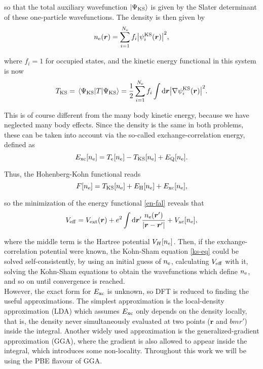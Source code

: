so that the total auxiliary wavefunction \(\ket{\Psi_{\mathrm{KS}}}\) is given by the Slater determinant of these one-particle wavefunctions. The density is then given by
\begin{equation}
	n_{\mathrm{e}}(\bm r)=\sum^{N_{\mathrm e}}_{i=1}f_i\abs{\psi_i^{\mathrm{KS}}(\bm r)}^2,
\end{equation}

where \(f_i=1\) for occupied states, and the kinetic energy functional in this system is now
\begin{equation}
T_{\mathrm{KS}}=\expval{T}{\Psi_{\mathrm{KS}}}=\frac1 2\sum_{i=1}^{N_{\mathrm e}}f_i\int\mathrm{d}\bm r\abs{\nabla\psi_i^{\mathrm{KS}}(\bm r)}^2.
\end{equation}

This is of course different from the many body kinetic energy, because we have neglected many body effects. Since the density is the same in both problems, these can be taken into account via the so-called exchange-correlation energy, defined as
\begin{equation}
E_{\mathrm{xc}}[n_{\mathrm{e}}]=T_{\mathrm{e}}[n_{\mathrm{e}}]-T_{\mathrm{KS}}[n_{\mathrm{e}}]+E_{\mathrm{Q}}[n_{\mathrm{e}}].
\end{equation}

Thus, the Hohenberg-Kohn functional reads
\begin{equation}
F[n_{\mathrm{e}}]=T_{\mathrm{KS}}[n_{\mathrm{e}}]+E_{\mathrm{H}}[n_{\mathrm{e}}]+E_{\mathrm{xc}}[n_{\mathrm{e}}],
\end{equation}

so the minimization of the energy functional \ref{en-fal} reveals that\parencite{Martin2004}
\begin{equation}
\label{veff}
V_{\mathrm{eff}}=V_{\mathrm{ext}}(\bm r)+e^2\int\mathrm{d}\bm r'\frac{n_{\mathrm{e}}(\bm r')}{\abs{\bm r-\bm r'}}+V_{\mathrm{xc}}[n_{\mathrm{e}}],
\end{equation}

where the middle term is the Hartree potential \(V_{H}[n_{\mathrm{e}}]\). Then, if the exchange-correlation potential were known, the Kohn-Sham equation \ref{ks-eq} could be solved self-consistently, by using an initial guess of \(n_{\mathrm{e}}\), calculating \(V_{\mathrm{eff}}\) with it, solving the Kohn-Sham equations to obtain the wavefunctions which define \(n_{\mathrm{e}}\), and so on until convergence is reached.\\

However, the exact form for \(E_{\mathrm{xc}}\) is unknown\parencite{Martin2004}, so DFT is reduced to finding the useful approximations. The simplest approximation is the local-density approximation (LDA)\parencite{Kohn1965} which assumes \(E_{\mathrm{xc}}\) only depends on the density locally, that is, the density never simultaneously evaluated at two points (\(\bm r\) and \(bm r'\)) inside the integral. Another widely used approximation is the generalized-gradient approximation (GGA)\parencite{Martin2004}, where the gradient is also allowed to appear inside the integral, which introduces some non-locality. Throughout this work we will be using the PBE\parencite{Perdew1996,Perdew1996a} flavour of GGA.

